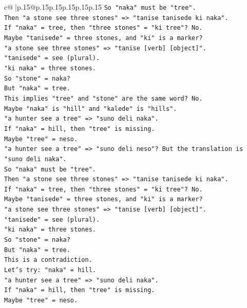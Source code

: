 \documentclass{article}
\begin{document}
{\begin{supertabular}{c@{$\;$}|p{.15\linewidth}@{}p{.15\linewidth}p{.15\linewidth}p{.15\linewidth}p{.15\linewidth}p{.15\linewidth}}
{{{\texttt{So "naka" must be "tree".} \\
\texttt{Then "a stone see three stones" => "tanise tanisede ki naka".} \\
\texttt{If "naka" = tree, then "three stones" = "ki tree"? No.} \\
\texttt{Maybe "tanisede" = three stones, and "ki" is a marker?} \\
\texttt{"a stone see three stones" => "tanise {[}verb{]} {[}object{]}".} \\
\texttt{"tanisede" = see (plural).} \\
\texttt{"ki naka" = three stones.} \\
\texttt{So "stone" = naka?} \\
\texttt{But "naka" = tree.} \\
\texttt{This implies "tree" and "stone" are the same word? No.} \\
\texttt{Maybe "naka" is "hill" and "kalede" is "hills".} \\
\texttt{"a hunter see a tree" => "suno deli naka".} \\
\texttt{If "naka" = hill, then "tree" is missing.} \\
\texttt{Maybe "tree" = neso.} \\
\texttt{"a hunter see a tree" => "suno deli neso"? But the translation is "suno deli naka".} \\
\texttt{So "naka" must be "tree".} \\
\texttt{Then "a stone see three stones" => "tanise tanisede ki naka".} \\
\texttt{If "naka" = tree, then "three stones" = "ki tree"? No.} \\
\texttt{Maybe "tanisede" = three stones, and "ki" is a marker?} \\
\texttt{"a stone see three stones" => "tanise {[}verb{]} {[}object{]}".} \\
\texttt{"tanisede" = see (plural).} \\
\texttt{"ki naka" = three stones.} \\
\texttt{So "stone" = naka?} \\
\texttt{But "naka" = tree.} \\
\texttt{This is a contradiction.} \\
\texttt{Let's try: "naka" = hill.} \\
\texttt{"a hunter see a tree" => "suno deli naka".} \\
\texttt{If "naka" = hill, then "tree" is missing.} \\
\texttt{Maybe "tree" = neso.} \\
}}}
\end{supertabular}}
\end{document}
